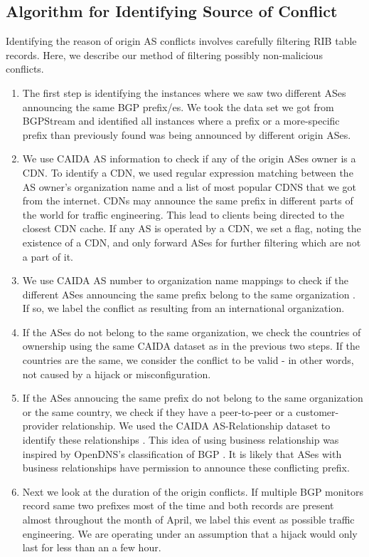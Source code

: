 \subsection{Algorithm for Identifying Source of Conflict}
Identifying the reason of origin AS conflicts involves carefully filtering RIB table records. Here, we describe our method of filtering possibly non-malicious conflicts. 
\begin{enumerate}
\item The first step is identifying the instances where we saw two different ASes announcing the same BGP prefix/es. We took the data set we got from BGPStream and identified all instances where a prefix or a more-specific prefix than previously found was being announced by different origin ASes. 
\item We use CAIDA AS information to check if any of the origin ASes owner is a CDN\cite{mapping}. To identify a CDN, we used regular expression matching between the AS owner's organization name and a list of most popular CDNS that we got from the internet. CDNs may announce the same prefix in different parts of the world for traffic engineering. This lead to clients being directed to the closest CDN cache. If any AS is operated by a CDN, we set a flag, noting the existence of a CDN, and only forward ASes for further filtering which are not a part of it. 
\item We use CAIDA AS number to organization name mappings to check if the different ASes announcing the same prefix belong to the same organization  \cite{mapping}. If so, we label the conflict as resulting from an international organization.
\item If the ASes do not belong to the same organization, we check the countries of ownership using the same CAIDA dataset as in the previous two steps. If the countries are the same, we consider the conflict to be valid - in other words, not caused by a hijack or misconfiguration.
\item If the ASes annoucing the same prefix do not belong to the same organization or the same country, we check if they have a peer-to-peer or a customer-provider relationship. We used the CAIDA AS-Relationship dataset to identify these relationships \cite{relation}. This idea of using business relationship was inspired by OpenDNS's classification of BGP \cite{opendns_blackhat_2015}. It is likely that ASes with business relationships have permission to announce these conflicting prefix. 
\item Next we look at the duration of the origin conflicts. If multiple BGP monitors record same two prefixes most of the time and both records are present almost throughout the month of April, we label this event as possible traffic engineering. We are operating under an assumption that a hijack would only last for less than an a few hour.

\end{enumerate}
